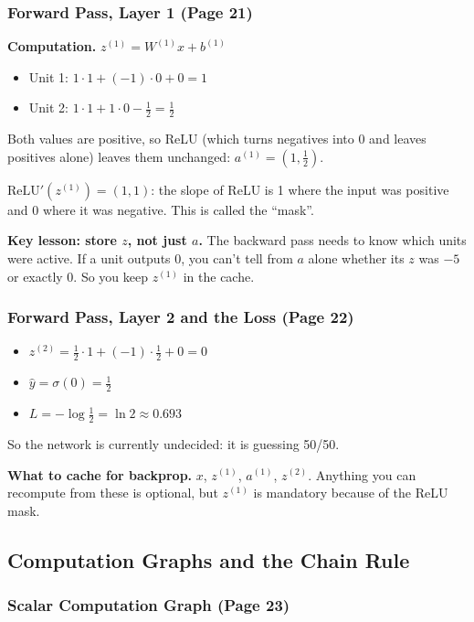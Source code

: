 \subsubsection*{Forward Pass, Layer 1 (Page 21)}

\textbf{Computation.} $z^{(1)} = W^{(1)} x + b^{(1)}$
\begin{itemize}
  \item Unit 1: $1\cdot 1 + (-1)\cdot 0 + 0 = 1$
  \item Unit 2: $1 \cdot 1 + 1 \cdot 0 - \tfrac12 = \tfrac12$
\end{itemize}
Both values are positive, so ReLU (which turns negatives into 0 and leaves positives alone) leaves them unchanged: $a^{(1)} = (1, \tfrac12)$.

$\mathrm{ReLU}'(z^{(1)}) = (1, 1)$: the slope of ReLU is 1 where the input was positive and 0 where it was negative. This is called the ``mask''.

\textbf{Key lesson: store $z$, not just $a$.} The backward pass needs to know which units were active. If a unit outputs 0, you can't tell from $a$ alone whether its $z$ was $-5$ or exactly 0. So you keep $z^{(1)}$ in the cache.

\subsubsection*{Forward Pass, Layer 2 and the Loss (Page 22)}

\begin{itemize}
  \item $z^{(2)} = \tfrac12 \cdot 1 + (-1)\cdot \tfrac12 + 0 = 0$
  \item $\hat{y} = \sigma(0) = \tfrac12$
  \item $L = -\log\tfrac12 = \ln 2 \approx 0.693$
\end{itemize}
So the network is currently undecided: it is guessing 50/50.

\textbf{What to cache for backprop.} $x$, $z^{(1)}$, $a^{(1)}$, $z^{(2)}$. Anything you can recompute from these is optional, but $z^{(1)}$ is mandatory because of the ReLU mask.

\subsection*{Computation Graphs and the Chain Rule}

\subsubsection*{Scalar Computation Graph (Page 23)}

